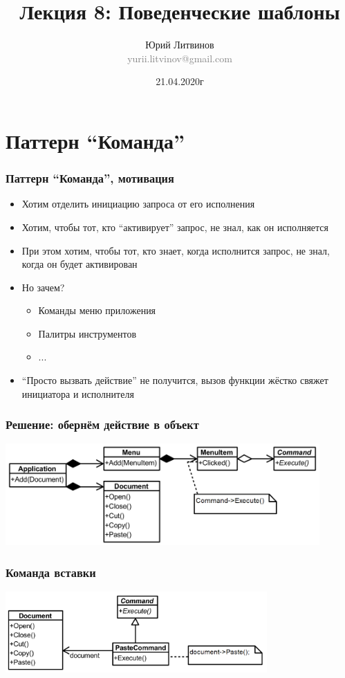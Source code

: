 \documentclass[xetex,mathserif,serif]{beamer}
\title[Шаблоны]{Лекция 8: Поведенческие шаблоны}
\author[Юрий Литвинов]{Юрий Литвинов\\\small{\textcolor{gray}{yurii.litvinov@gmail.com}}}
\date{21.04.2020г}
\begin{document}
	\frame{\titlepage}

	\section{Паттерн ``Команда''}

	\begin{frame}
		\frametitle{Паттерн ``Команда'', мотивация}
		\begin{itemize}
			\item Хотим отделить инициацию запроса от его исполнения
			\item Хотим, чтобы тот, кто ``активирует'' запрос, не знал, как он исполняется
			\item При этом хотим, чтобы тот, кто знает, когда исполнится запрос, не знал, когда он будет активирован
			\item Но зачем?
			\begin{itemize}
				\item Команды меню приложения
				\item Палитры инструментов
				\item ...
			\end{itemize}
			\item ``Просто вызвать действие'' не получится, вызов функции жёстко свяжет инициатора и исполнителя
		\end{itemize}
	\end{frame}

	\begin{frame}
		\frametitle{Решение: обернём действие в объект}
		\begin{center}
			\includegraphics[width=0.9\textwidth]{commandExample.png}
		\end{center}
	\end{frame}

	\begin{frame}
		\frametitle{Команда вставки}
		\begin{center}
			\includegraphics[width=0.75\textwidth]{pasteCommand.png}
		\end{center}
	\end{frame}
\end{document}
